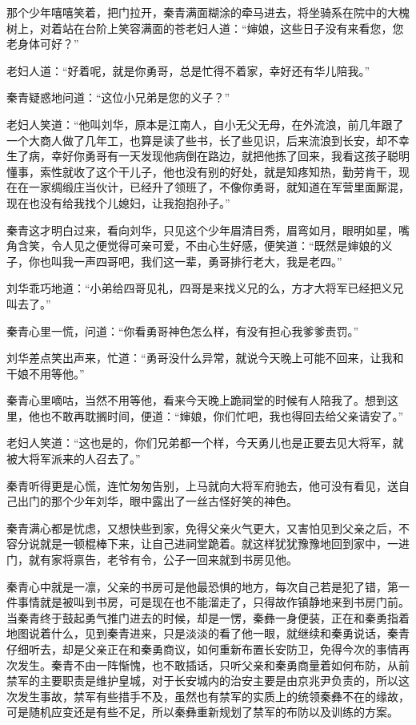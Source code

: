 那个少年嘻嘻笑着，把门拉开，秦青满面糊涂的牵马进去，将坐骑系在院中的大槐树上，对着站在台阶上笑容满面的苍老妇人道：“婶娘，这些日子没有来看您，您老身体可好？”

老妇人道：“好着呢，就是你勇哥，总是忙得不着家，幸好还有华儿陪我。”

秦青疑惑地问道：“这位小兄弟是您的义子？”

老妇人笑道：“他叫刘华，原本是江南人，自小无父无母，在外流浪，前几年跟了一个大商人做了几年工，也算是读了些书，长了些见识，后来流浪到长安，却不幸生了病，幸好你勇哥有一天发现他病倒在路边，就把他拣了回来，我看这孩子聪明懂事，索性就收了这个干儿子，他也没有别的好处，就是知疼知热，勤劳肯干，现在在一家绸缎庄当伙计，已经升了领班了，不像你勇哥，就知道在军营里面厮混，现在也没有给我找个儿媳妇，让我抱抱孙子。”

秦青这才明白过来，看向刘华，只见这个少年眉清目秀，眉弯如月，眼明如星，嘴角含笑，令人见之便觉得可亲可爱，不由心生好感，便笑道：“既然是婶娘的义子，你也叫我一声四哥吧，我们这一辈，勇哥排行老大，我是老四。”

刘华乖巧地道：“小弟给四哥见礼，四哥是来找义兄的么，方才大将军已经把义兄叫去了。”

秦青心里一慌，问道：“你看勇哥神色怎么样，有没有担心我爹爹责罚。”

刘华差点笑出声来，忙道：“勇哥没什么异常，就说今天晚上可能不回来，让我和干娘不用等他。”

秦青心里嘀咕，当然不用等他，看来今天晚上跪祠堂的时候有人陪我了。想到这里，他也不敢再耽搁时间，便道：“婶娘，你们忙吧，我也得回去给父亲请安了。”

老妇人笑道：“这也是的，你们兄弟都一个样，今天勇儿也是正要去见大将军，就被大将军派来的人召去了。”

秦青听得更是心慌，连忙匆匆告别，上马就向大将军府驰去，他可没有看见，送自己出门的那个少年刘华，眼中露出了一丝古怪好笑的神色。

秦青满心都是忧虑，又想快些到家，免得父亲火气更大，又害怕见到父亲之后，不容分说就是一顿棍棒下来，让自己进祠堂跪着。就这样犹犹豫豫地回到家中，一进门，就有家将禀告，老爷有令，公子一回来就到书房见他。

秦青心中就是一凛，父亲的书房可是他最恐惧的地方，每次自己若是犯了错，第一件事情就是被叫到书房，可是现在也不能溜走了，只得故作镇静地来到书房门前。当秦青终于鼓起勇气推门进去的时候，却是一愣，秦彝一身便装，正在和秦勇指着地图说着什么，见到秦青进来，只是淡淡的看了他一眼，就继续和秦勇说话，秦青仔细听去，却是父亲正在和秦勇商议，如何重新布置长安防卫，免得今次的事情再次发生。秦青不由一阵惭愧，也不敢插话，只听父亲和秦勇商量着如何布防，从前禁军的主要职责是维护皇城，对于长安城内的治安主要是由京兆尹负责的，所以这次发生事故，禁军有些措手不及，虽然也有禁军的实质上的统领秦彝不在的缘故，可是随机应变还是有些不足，所以秦彝重新规划了禁军的布防以及训练的方案。

